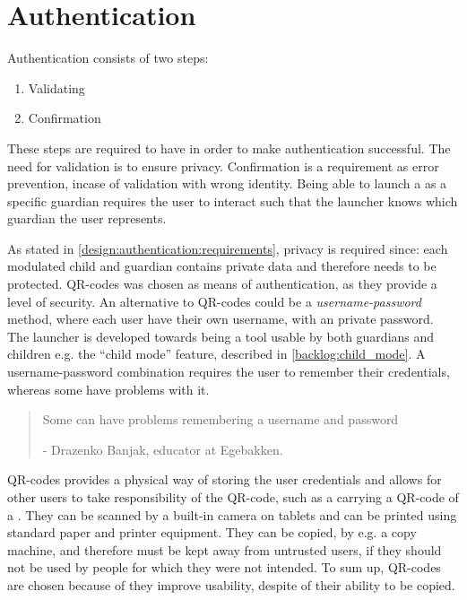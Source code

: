 \section{Authentication}
\label{design:authentication}
\label{design:authentication:requirements}

\noindent Authentication consists of two steps:
\begin{enumerate}
	\item Validating
	\item Confirmation
\end{enumerate}
These steps are required to have in order to make authentication successful. The need for validation is to ensure privacy. Confirmation is a requirement as error prevention, incase of validation with wrong identity.
\label{design:authentication:solution}
Being able to launch a \girafapp[] as a specific guardian requires the user to interact such that the launcher knows which guardian the user represents.

As stated in \autoref{design:authentication:requirements}, privacy is required since: each modulated child and guardian contains private data and therefore needs to be protected.
QR-codes was chosen as means of authentication, as they provide a level of security.
An alternative to QR-codes could be a \emph{username-password} method, where each user have their own username, with an private password.
The launcher is developed towards being a tool usable by both guardians and children e.g. the ``child mode'' feature, described in \autoref{backlog:child_mode}.
A username-password combination requires the user to remember their credentials, whereas some \autists[] have problems with it.

\begin{quotation}
Some \autists[] can have problems remembering a username and password\\ 
	\begin{flushright}
		- Drazenko Banjak, educator at Egebakken.
	\end{flushright}
\end{quotation}

QR-codes provides a physical way of storing the user credentials and allows for other users to take responsibility of the QR-code, such as a \guardian[] carrying a QR-code of a \autist[].
They can be scanned by a built-in camera on tablets and can be printed using standard paper and printer equipment. 
They can be copied, by e.g. a copy machine, and therefore must be kept away from untrusted users, if they should not be used by people for which they were not intended.
To sum up, QR-codes are chosen because of they improve usability, despite of their ability to be copied.  \\

